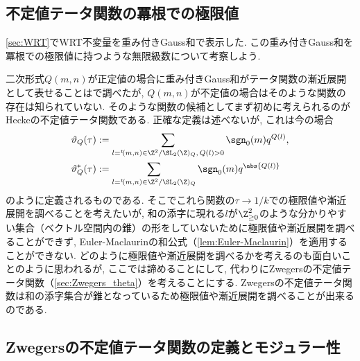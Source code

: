 \documentclass[11pt,b5paper,oneside,lualatex]{ltjsarticle} %
\numberwithin{equation}{section} %
\begin{document}


\subsection{不定値テータ関数の冪根での極限値} \label{subsec:indef_theta_limit}


\cref{sec:WRT}でWRT不変量を重み付きGauss和で表示した.
この重み付きGauss和を冪根での極限値に持つような無限級数について考察しよう. 

二次形式$ Q(m, n) $が正定値の場合に重み付きGauss和がテータ関数の漸近展開として表せることは\cite{MM}で調べたが, $ Q(m, n) $が不定値の場合はそのような関数の存在は知られていない. 
そのような関数の候補としてまず初めに考えられるのがHeckeの不定値テータ関数である. 
正確な定義は述べないが, これは今の場合
\begin{align}
	\vartheta_Q (\tau) 
	&:=
	\sum_{l = {}^t\!(m, n) \in \Z^2 / \SL_2(\Z)_Q, \, Q(l) > 0} \sgn_0(m) q^{Q(l)}, 
	\\
	\vartheta_Q^* (\tau)
	&:=
	\sum_{l = {}^t\!(m, n) \in \Z^2 / \SL_2(\Z)_Q} \sgn_0(m) q^{\abs{Q(l)}}
\end{align}
のように定義されるものである. 
そこでこれら関数の$ \tau \to 1/k $での極限値や漸近展開を調べることを考えたいが, 和の添字に現れる$ l $が$ \Z_{\ge 0}^2 $のような分かりやすい集合（ベクトル空間内の錐）の形をしていないために極限値や漸近展開を調べることができず, Euler-Maclaurinの和公式（\cref{lem:Euler-Maclaurin}）を適用することができない.
どのように極限値や漸近展開を調べるかを考えるのも面白いことのように思われるが, ここでは諦めることにして, 代わりにZwegersの不定値テータ関数（\cref{sec:Zwegers_theta}）を考えることにする. 
Zwegersの不定値テータ関数は和の添字集合が錐となっているため極限値や漸近展開を調べることが出来るのである. 


\subsection{Zwegersの不定値テータ関数の定義とモジュラー性} \label{subsec:Zwegers_theta_def}
\end{document}
